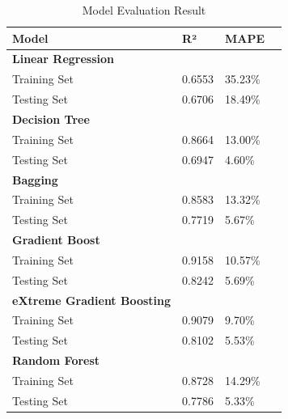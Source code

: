 \documentclass[conference]{IEEEtran}
\begin{document}
    \begin{table}[h]
        \centering
        \renewcommand{\arraystretch}{1.1}
        \begin{tabular}{
            | p{}
            | p{} 
            | p{} |
            | p{}
            }
            \hline
            \textbf{Model} & \textbf{R²} & \textbf{MAPE} \\
            \hline
            \multicolumn{1}{|l}{\textbf{Linear Regression}} \\
            \hline
            Training Set   & 0.6553 & 35.23\% \\
            \hline
            Testing Set & 0.6706 & 18.49\% \\
            \hline
            \multicolumn{1}{|l}{\textbf{Decision Tree}}\\
            \hline
            Training Set & 0.8664 & 13.00\% \\
            \hline
            Testing Set & 0.6947 & 4.60\%\\
            \hline
            \multicolumn{1}{|l}{\textbf{Bagging}} \\
            \hline
            Training Set & 0.8583 & 13.32\% \\
            \hline
            Testing Set & 0.7719 & 5.67\% \\
            \hline
            \multicolumn{1}{|l}{\textbf{Gradient Boost}}\\
            \hline
            Training Set & 0.9158 & 10.57\% \\
            \hline
            Testing Set & 0.8242 & 5.69\% \\
            \hline
            \multicolumn{1}{|l}{\textbf{eXtreme Gradient Boosting}}\\
            \hline
            Training Set & 0.9079 & 9.70\% \\
            \hline
            Testing Set & 0.8102 & 5.53\%\\
            \hline
            \multicolumn{1}{|l}{\textbf{Random Forest}}\\
            \hline
            Training Set & 0.8728 & 14.29\% \\
            \hline
            Testing Set & 0.7786 & 5.33\% \\
            \hline
        \end{tabular}
    \caption{Model Evaluation Result}
    \end{table}
    
\end{document}
